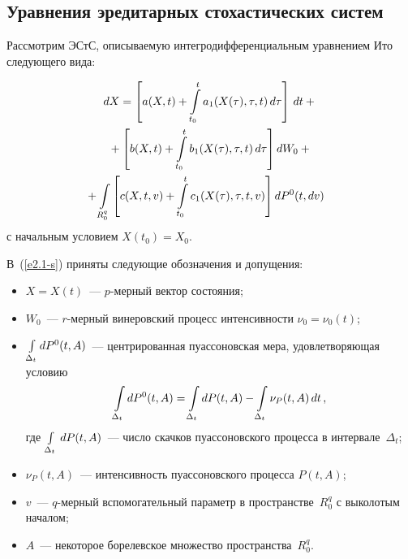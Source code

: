 \begin{multicols}{2}
\section{Уравнения эредитарных стохастических систем}

Рассмотрим ЭСтС, описываемую интегродифференциальным уравнением Ито следующего вида:

\noindent
\begin{multline}
d X =\lk a (X,t) +\iii_{t_0}^t a_1 (X(\tau),\tau, t)\, d \tau\rk\, dt+{}\\
{}+\lk b(X, t) +\iii_{t_0}^t b_1 (X(\tau), \tau, t)\, d \tau\rk dW_0+{}\\
\hspace*{-4mm}  {}+\iii_{R_0^q} \lk c(X,t,v) +\iii_{t_0}^t c_1 (X(\tau),  \tau, t,v) \rk d P^0 (t, dv)\!
  \label{e2.1-s}
  \end{multline}
с начальным условием $X(t_0)= X_0$.

В~(\ref{e2.1-s}) приняты следующие обозначения и допущения:
\begin{itemize}
\item    $X=X(t)$~--- $p$-мер\-ный вектор состояния;
\item
    $W_0$~--- $r$-мер\-ный винеровский процесс интенсивности $\nu_0 = \nu_0 (t)$;
\item
    $ \int\limits_{\Delta_t} d P^0 (t, A)$~--- центрированная пуассоновская мера, 
    удовлетворяющая условию
$$
\int\limits_{\Delta_t} d P^0 (t, A)=\int\limits_{\Delta_t} dP (t, A)-\int\limits_{\Delta_t} \nu_P (t, A) \,dt\,, 
$$
где $\int\limits_{\Delta_t}\,dP(t, A)$~--- число скачков пуассоновского процесса в интервале~$\Delta_t$;
\item
    $\nu_P (t,A)$~--- интенсивность пуассоновского процесса $P(t, A)$;
\item
    $v$~--- $q$-мер\-ный вспомогательный параметр в пространстве~$R_0^q$ с выколотым началом;
\item
    $A$~--- некоторое борелевское множество пространства~$R_0^q$.
\end{itemize}


\end{multicols}
